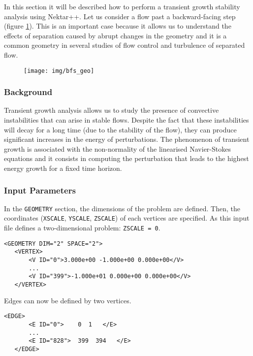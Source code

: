 In this section it will be described how to perform a transient growth stability analysis using Nektar++. Let us consider a flow past a backward-facing step (figure \ref{bfs_geo}). This is an important case because it allows us to understand  the effects of separation caused by abrupt changes in the geometry and it is a common geometry in several studies of flow control and turbulence of separated flow.

\begin{figure}[!htbp]
\centering
 {\texttt{[image: img/bfs\_geo]}}
    \caption {}\label{bfs_geo}
\end{figure}

\subsubsection{Background}

Transient growth analysis allows us to study the presence of convective instabilities that can arise in stable flows. Despite the fact that these instabilities will decay for a long time (due to the stability of the flow), they can produce significant increases in the energy of perturbations. The phenomenon of transient growth is associated with the non-normality of the linearised Navier-Stokes equations and it consists in computing the perturbation that leads to the highest energy growth for a fixed time horizon.

\subsubsection{Input Parameters}

In the \texttt{GEOMETRY} section, the dimensions of the problem are defined. Then, the coordinates (\texttt{XSCALE}, \texttt{YSCALE}, \texttt{ZSCALE}) of each vertices are specified. As this input file defines a two-dimensional problem: \texttt{ZSCALE = 0}.

      \begin{lstlisting}[style=XMLStyle]
<GEOMETRY DIM="2" SPACE="2">
   <VERTEX>
       <V ID="0">3.000e+00 -1.000e+00 0.000e+00</V>
       ...
       <V ID="399">-1.000e+01 0.000e+00 0.000e+00</V>
   </VERTEX>
     \end{lstlisting}

Edges can now be defined by two vertices.

      \begin{lstlisting}[style=XMLStyle]
<EDGE>
       <E ID="0">    0  1   </E>
       ...
       <E ID="828">  399  394   </E>
   </EDGE>
        \end{lstlisting}

